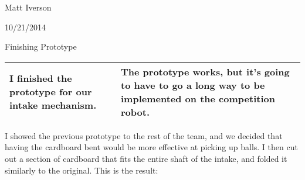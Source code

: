 Matt Iverson

10/21/2014

Finishing Prototype

\begin{tabular}{|p{5cm}|p{5cm}|}
 \hline
 I finished the prototype for our intake mechanism.
 &
 The prototype works, but it’s going to have to go a long way to be implemented on the competition robot.
 \\
 \hline
\end{tabular}

I showed the previous prototype to the rest of the team, and we decided that having the cardboard bent would be more effective at picking up balls. I then cut out a section of cardboard that fits the entire shaft of the intake, and folded it similarly to the original. This is the result: 


